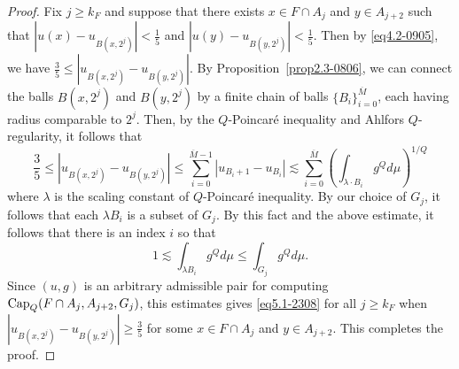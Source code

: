 \documentclass[10pt]{amsart}
\newtheorem{lemma}[theorem]{Lemma}
\numberwithin{equation}{section}
\begin{document}
\begin{proof}
 Fix $j\ge k_F$ and suppose that there exists $x\in F\cap A_j$ and $y\in A_{j+2}$ such that $|u(x)-u_{B(x,2^j)}|<\frac{1}{5}$ and $|u(y)-u_{B(y,2^j)}|<\frac{1}{5}$.  Then by \eqref{eq4.2-0905}, we have $\frac{3}{5}\le|u_{B(x,2^j)}-u_{B(y, 2^{j})}|.$
By Proposition~\ref{prop2.3-0806}, we can connect the balls $B(x,2^j)$ and $B(y,2^j)$ by a finite chain of balls $\{B_i\}_{i=0}^{\overline M}$, each having radius comparable to $2^j$. Then, by the $Q$-Poincar\'e inequality and Ahlfors $Q$-regularity, it follows that 
 \[
 \frac{3}{5}\leq |u_{B(x,2^j)}-u_{B(y, 2^{j})}|\leq \sum_{i=0}^{{\overline M}-1}|u_{B_i+1}-u_{B_i}|\lesssim \sum_{i=0}^{\overline{M}} \left(\int_{\lambda \cdot B_i}g^Qd\mu \right)^{1/Q}
 \]
 where $\lambda$ is the scaling constant of $Q$-Poincar\'e inequality.  By our choice of $G_j$, it follows that each $\lambda B_i$ is a subset of $G_j$.  By this fact and the above estimate, it follows that there is an index $i$ so that 
 \[
 	1\lesssim \int_{\lambda B_i}g^Qd\mu \leq \int_{G_j}g^Qd\mu.
 \]
Since $(u,g)$ is an arbitrary admissible pair for computing $ \text{\rm Cap}_Q(F\cap A_{j}, A_{j+2}, G_j)$, this estimates gives \eqref{eq5.1-2308} for all $j\ge k_F$ when $|u_{B(x,2^j)}-u_{B(y, 2^{j})}|\geq \frac{3}{5}$ for some $x\in F\cap A_j$ and $y\in A_{j+2}$. This completes the proof.
\end{proof}

\end{document}
